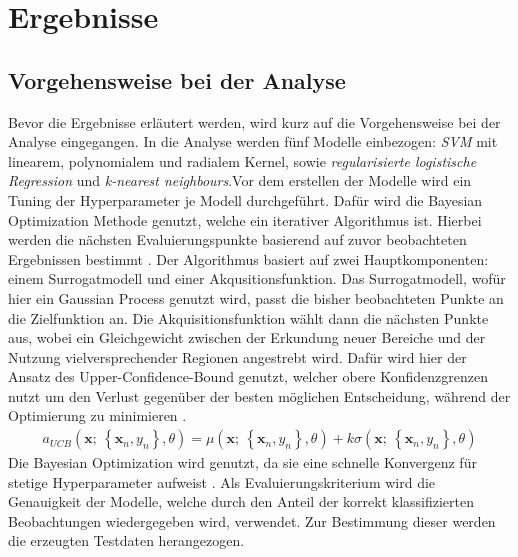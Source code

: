 \documentclass[
]{article}
\begin{document}
\section{Ergebnisse}

\subsection{Vorgehensweise bei der Analyse}

Bevor die Ergebnisse erläutert werden, wird kurz auf die Vorgehensweise
bei der Analyse eingegangen. In die Analyse werden fünf Modelle
einbezogen: \textit{SVM} mit linearem, polynomialem und radialem Kernel,
sowie \textit{regularisierte logistische Regression} und
\textit{k-nearest neighbours}.\newline Vor dem erstellen der Modelle
wird ein Tuning der Hyperparameter je Modell durchgeführt. Dafür wird
die Bayesian Optimization Methode genutzt, welche ein iterativer
Algorithmus ist. Hierbei werden die nächsten Evaluierungspunkte
basierend auf zuvor beobachteten Ergebnissen bestimmt
\parencite{yangHyperparameterOptimizationMachine2020}. Der Algorithmus
basiert auf zwei Hauptkomponenten: einem Surrogatmodell und einer
Akqusitionsfunktion. Das Surrogatmodell, wofür hier ein Gaussian Process
genutzt wird, passt die bisher beobachteten Punkte an die Zielfunktion
an. Die Akquisitionsfunktion wählt dann die nächsten Punkte aus, wobei
ein Gleichgewicht zwischen der Erkundung neuer Bereiche und der Nutzung
vielversprechender Regionen angestrebt wird. Dafür wird hier der Ansatz
des Upper-Confidence-Bound genutzt, welcher obere Konfidenzgrenzen nutzt
um den Verlust gegenüber der besten möglichen Entscheidung, während der
Optimierung zu minimieren
\parencite{snoekPracticalBayesianOptimization2012}. \begin{align}
a_{UCB}(\mathbf{x};~\left\{\mathbf{x}_n,y_n\right\},\theta) = \mu(\mathbf{x};~\left\{\mathbf{x}_n,y_n\right\},\theta) + k \sigma(\mathbf{x};~\left\{\mathbf{x}_n,y_n\right\},\theta)
\end{align} Die Bayesian Optimization wird genutzt, da sie eine schnelle
Konvergenz für stetige Hyperparameter aufweist
\parencite{yangHyperparameterOptimizationMachine2020}. Als
Evaluierungskriterium wird die Genauigkeit der Modelle, welche durch den
Anteil der korrekt klassifizierten Beobachtungen wiedergegeben wird,
verwendet. Zur Bestimmung dieser werden die erzeugten Testdaten
herangezogen.
\end{document}
